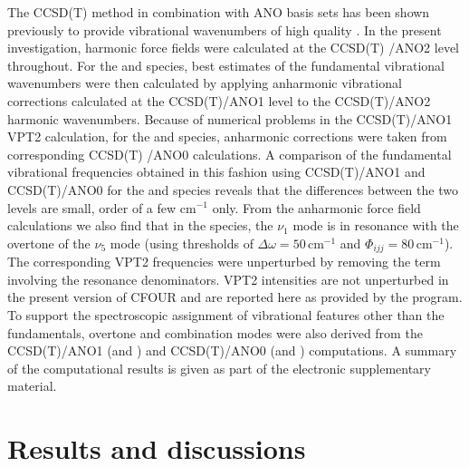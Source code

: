 The CCSD(T) method in combination
with ANO basis sets has been shown previously to provide vibrational wavenumbers of high quality \cite{mccaslin_MolPhys_111_1492_2013,thorwirth_JMS_251_220_2008}.
In the present investigation, harmonic force fields were calculated at the
CCSD(T) /ANO2 level throughout. 
For the \cycD and \lin species, best estimates of the fundamental vibrational wavenumbers
were then calculated by applying anharmonic vibrational corrections 
calculated at the CCSD(T)/ANO1 level to the CCSD(T)/ANO2 harmonic wavenumbers.
Because of numerical problems in the CCSD(T)/ANO1 VPT2 calculation, for the 
\cyc and \linD species, anharmonic corrections were taken from corresponding CCSD(T) /ANO0 calculations. A comparison of the fundamental vibrational frequencies obtained in this fashion
using CCSD(T)/ANO1 and CCSD(T)/ANO0 for the \cycD and \lin species reveals that
the differences between the two levels are small, order of a few cm$^{-1}$ only.
From the anharmonic force field calculations we also find that in the \cycD species,
the $\nu_1$ mode is in resonance with the overtone of the $\nu_5$ mode
(using thresholds of $\Delta \omega = 50$\,cm$^{-1}$ and $\Phi_{ijj}=80$\,cm$^{-1}$). 
The corresponding VPT2 frequencies were unperturbed by removing the term
involving the resonance denominators. VPT2 intensities are not unperturbed in the present version of CFOUR and are reported here as provided by the program.
To support the spectroscopic assignment of vibrational features other than the fundamentals,
overtone and combination modes were also derived from the CCSD(T)/ANO1 (\cycD and \linn) and
CCSD(T)/ANO0 (\cyc and \linDn) computations. 
A summary of the computational results is given as part of the electronic
supplementary material.\\


\section{Results and discussions}

